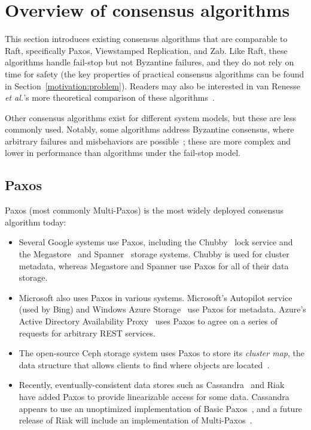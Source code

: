 \section{Overview of consensus algorithms}
\label{related:overview}

This section introduces existing consensus algorithms that are
comparable to Raft, specifically Paxos, Viewstamped Replication, and
Zab. Like Raft, these algorithms handle
fail-stop but not Byzantine failures, and they do not rely on time for
safety (the key properties of practical consensus algorithms can be
found in Section~\ref{motivation:problem}). Readers may also be
interested in van Renesse \emph{et al.}'s more theoretical comparison of
these algorithms~\cite{Renesse:2014}.

Other consensus algorithms exist for
different system models, but these are less commonly used. Notably, some
algorithms address Byzantine consensus, where arbitrary failures and
misbehaviors are possible~\cite{Castro:1999,Liskov:2010,Martin:2005};
these are more complex and lower in performance than algorithms under
the fail-stop model.

\subsection{Paxos}

Paxos (most commonly Multi-Paxos) is the most widely deployed consensus
algorithm today:
%
\begin{itemize}
%
\item Several Google systems use Paxos, including the
Chubby~\cite{Burrows:2006, Chandra:2007} lock service and the
Megastore~\cite{Baker:2011} and Spanner~\cite{Corbett:2012} storage
systems. Chubby is used for cluster metadata, whereas
Megastore and Spanner use Paxos for all of their data storage.
%
\item Microsoft also uses Paxos in various systems. Microsoft's
Autopilot service~\cite{Isard:2007} (used by Bing) and Windows Azure
Storage~\cite{Calder:2011} use Paxos for metadata. Azure's Active
Directory Availability Proxy~\cite{azure:availability} uses Paxos to
agree on a series of requests for arbitrary REST services.
%
%
%
\item The open-source Ceph storage system uses Paxos to store its
\emph{cluster map}, the data structure that allows clients to find
where objects are located~\cite{Weil:2006,ceph:monitor}.
%
\item Recently, eventually-consistent data stores such as
Cassandra~\cite{Cassandra} and Riak~\cite{Riak} have added Paxos to
provide linearizable access for some data. Cassandra appears to
use an unoptimized implementation of Basic Paxos~\cite{Ellis:2013}, and
a future release of Riak will include an implementation of
Multi-Paxos~\cite{Blomstedt:2013}.
%
%
\end{itemize}

